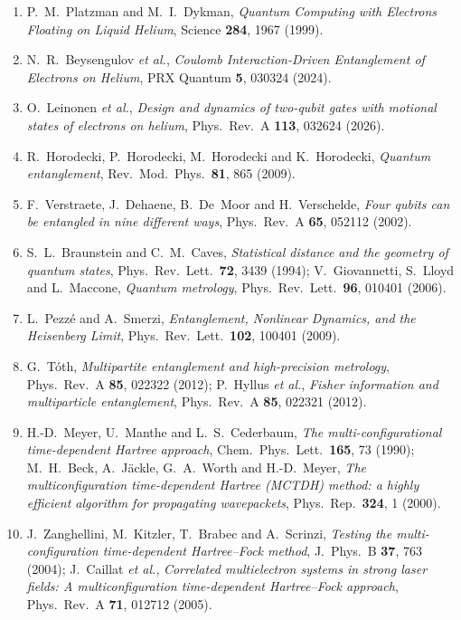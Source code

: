 \documentclass[12pt,a4paper]{article}
\begin{document}
\begin{enumerate}
    \item P.~M.~Platzman and M.~I.~Dykman, \textit{Quantum Computing with Electrons Floating on Liquid Helium}, Science \textbf{284}, 1967 (1999).
    \item N.~R.~Beysengulov \textit{et al.}, \textit{Coulomb Interaction-Driven Entanglement of Electrons on Helium}, PRX Quantum \textbf{5}, 030324 (2024).
    \item O.~Leinonen \textit{et al.}, \textit{Design and dynamics of two-qubit gates with motional states of electrons on helium}, Phys.\ Rev.\ A \textbf{113}, 032624 (2026).
    \item R.~Horodecki, P.~Horodecki, M.~Horodecki and K.~Horodecki, \textit{Quantum entanglement}, Rev.\ Mod.\ Phys.\ \textbf{81}, 865 (2009).
    \item F.~Verstraete, J.~Dehaene, B.~De~Moor and H.~Verschelde, \textit{Four qubits can be entangled in nine different ways}, Phys.\ Rev.\ A \textbf{65}, 052112 (2002).
    \item S.~L.~Braunstein and C.~M.~Caves, \textit{Statistical distance and the geometry of quantum states}, Phys.\ Rev.\ Lett.\ \textbf{72}, 3439 (1994); V.~Giovannetti, S.~Lloyd and L.~Maccone, \textit{Quantum metrology}, Phys.\ Rev.\ Lett.\ \textbf{96}, 010401 (2006).
    \item L.~Pezz\'e and A.~Smerzi, \textit{Entanglement, Nonlinear Dynamics, and the Heisenberg Limit}, Phys.\ Rev.\ Lett.\ \textbf{102}, 100401 (2009).
    \item G.~T\'oth, \textit{Multipartite entanglement and high-precision metrology}, Phys.\ Rev.\ A \textbf{85}, 022322 (2012); P.~Hyllus \textit{et al.}, \textit{Fisher information and multiparticle entanglement}, Phys.\ Rev.\ A \textbf{85}, 022321 (2012).
    \item H.-D.~Meyer, U.~Manthe and L.~S.~Cederbaum, \textit{The multi-configurational time-dependent Hartree approach}, Chem.\ Phys.\ Lett.\ \textbf{165}, 73 (1990); M.~H.~Beck, A.~J\"ackle, G.~A.~Worth and H.-D.~Meyer, \textit{The multiconfiguration time-dependent Hartree (MCTDH) method: a highly efficient algorithm for propagating wavepackets}, Phys.\ Rep.\ \textbf{324}, 1 (2000).
    \item J.~Zanghellini, M.~Kitzler, T.~Brabec and A.~Scrinzi, \textit{Testing the multi-configuration time-dependent Hartree--Fock method}, J.\ Phys.\ B \textbf{37}, 763 (2004); J.~Caillat \textit{et al.}, \textit{Correlated multielectron systems in strong laser fields: A multiconfiguration time-dependent Hartree--Fock approach}, Phys.\ Rev.\ A \textbf{71}, 012712 (2005).

\end{enumerate}
\end{document}
